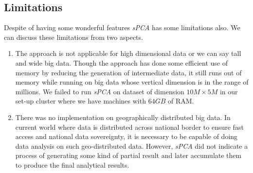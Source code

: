 \subsection{Limitations}
Despite of having some wonderful features \textit{sPCA} has some limitations also. We can discuss these limitations from two aspects.

\begin{enumerate}
\item The approach is not applicable for high dimensional data or we can say tall and wide big data. Though the approach has done some efficient use of memory by reducing the generation of intermediate data, it still runs out of memory while running on big data whose vertical dimension is in the range of millions. We failed to run \textit{sPCA} on dataset of dimension $10M\times5M$ in our set-up cluster where we have machines with $64GB$ of RAM.\\   

\item There was no implementation on geographically distributed big data. In current world where data is distributed across national border to ensure fast access and national data sovereignty, it is necessary to be capable of doing data analysis on such geo-distributed data. However, \textit{sPCA} did not indicate a process of generating some kind of partial result and later accumulate them to produce the final analytical results.
\end{enumerate}







\endinput